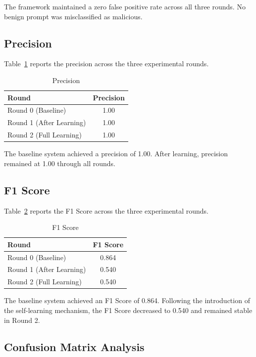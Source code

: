 \documentclass[10pt, conference, compsoc]{IEEEtran}
\begin{document}
The framework maintained a zero false positive rate across all three rounds. No benign prompt was misclassified as malicious.

\subsection{Precision}

Table~\ref{tab:precision} reports the precision across the three experimental rounds.

\begin{table}[htbp]
\centering
\caption{Precision}
\label{tab:precision}
\begin{tabular}{|l|c|}
\hline
Round & Precision \\
\hline
Round 0 (Baseline) & 1.00 \\
\hline
Round 1 (After Learning) & 1.00 \\
\hline
Round 2 (Full Learning) & 1.00 \\
\hline
\end{tabular}
\end{table}

The baseline system achieved a precision of 1.00. After learning, precision remained at 1.00 through all rounds.

\subsection{F1 Score}

Table~\ref{tab:f1} reports the F1 Score across the three experimental rounds.

\begin{table}[htbp]
\centering
\caption{F1 Score}
\label{tab:f1}
\begin{tabular}{|l|c|}
\hline
Round & F1 Score \\
\hline
Round 0 (Baseline) & 0.864 \\
\hline
Round 1 (After Learning) & 0.540 \\
\hline
Round 2 (Full Learning) & 0.540 \\
\hline
\end{tabular}
\end{table}

The baseline system achieved an F1 Score of 0.864. Following the introduction of the self-learning mechanism, the F1 Score decreased to 0.540 and remained stable in Round 2.

\subsection{Confusion Matrix Analysis}
\end{document}

